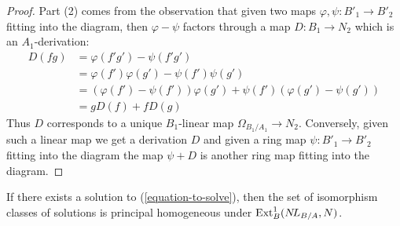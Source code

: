 \begin{proof}
\medskip\noindent
Part (2) comes from the observation that given two maps
$\varphi, \psi : B'_1 \to B'_2$ fitting into the diagram, then
$\varphi - \psi$ factors through a map $D : B_1 \to N_2$ which
is an $A_1$-derivation:
\begin{align*}
D(fg) & = \varphi(f'g') - \psi(f'g') \\
& =
\varphi(f')\varphi(g') - \psi(f')\psi(g') \\
& =
(\varphi(f') - \psi(f'))\varphi(g') + \psi(f')(\varphi(g') - \psi(g')) \\
& =
gD(f) + fD(g)
\end{align*}
Thus $D$ corresponds to a unique $B_1$-linear map
$\Omega_{B_1/A_1} \to N_2$. Conversely, given such a linear map
we get a derivation $D$ and given a ring map $\psi : B'_1 \to B'_2$
fitting into the diagram
the map $\psi + D$ is another ring map fitting into the diagram.
\end{proof}

\begin{lemma}
\label{lemma-choices}
If there exists a solution to (\ref{equation-to-solve}), then the set of
isomorphism classes of solutions is principal homogeneous under
$\mathop{\mathrm{Ext}}\nolimits^1_B(\mathop{N\!L}\nolimits_{B/A}, N)$.
\end{lemma}


